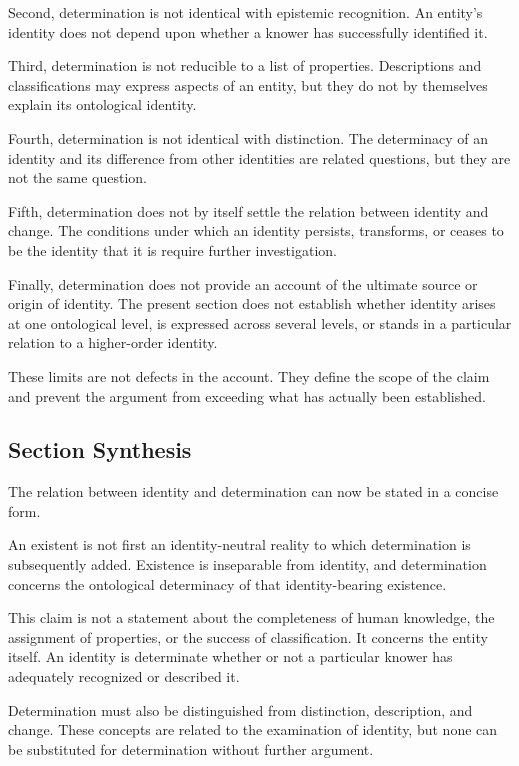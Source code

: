 Second, determination is not identical with epistemic
recognition. An entity's identity does not depend upon
whether a knower has successfully identified it.

Third, determination is not reducible to a list of properties.
Descriptions and classifications may express aspects of
an entity, but they do not by themselves explain its
ontological identity.

Fourth, determination is not identical with distinction.
The determinacy of an identity and its difference from
other identities are related questions, but they are not
the same question.

Fifth, determination does not by itself settle the relation
between identity and change. The conditions under which
an identity persists, transforms, or ceases to be the identity
that it is require further investigation.

Finally, determination does not provide an account of the
ultimate source or origin of identity. The present section
does not establish whether identity arises at one ontological
level, is expressed across several levels, or stands in a
particular relation to a higher-order identity.

These limits are not defects in the account. They define
the scope of the claim and prevent the argument from
exceeding what has actually been established.

\subsection{Section Synthesis}

The relation between identity and determination can now
be stated in a concise form.

An existent is not first an identity-neutral reality to
which determination is subsequently added. Existence is
inseparable from identity, and determination concerns
the ontological determinacy of that identity-bearing
existence.

This claim is not a statement about the completeness
of human knowledge, the assignment of properties, or
the success of classification. It concerns the entity
itself. An identity is determinate whether or not a
particular knower has adequately recognized or described
it.

Determination must also be distinguished from distinction,
description, and change. These concepts are related to
the examination of identity, but none can be substituted
for determination without further argument.


